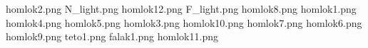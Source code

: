 homlok2.png
N_light.png
homlok12.png
F_light.png
homlok8.png
homlok1.png
homlok4.png
homlok5.png
homlok3.png
homlok10.png
homlok7.png
homlok6.png
homlok9.png
teto1.png
falak1.png
homlok11.png
